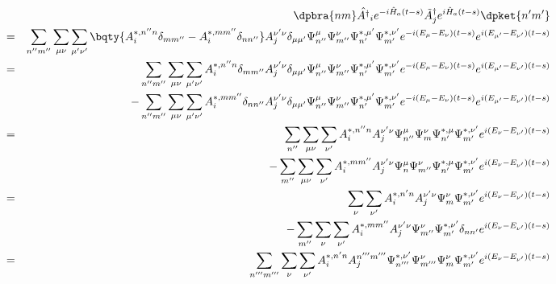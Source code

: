 \documentclass[10.5pt,a4paper]{jreport}
\begin{document}
\begin{eqnarray}
  \nonumber &&\dpbra{nm}\hat{A^\dagger}_ie^{-i\hat{H}_a(t-s)}\tilde{A}_j^\dagger e^{i\hat{H}_a(t-s)}\dpket{n'm'}\\
  \nonumber &=& \sum_{n''m''}\sum_{\mu\nu}\sum_{\mu'\nu'}\bqty{A_i^{*,  {n''n}}\delta_{mm''} - A_i^{*,  {mm''}}\delta_{nn''}}A_j^{ {\nu'\nu}}\delta_{ {\mu\mu'}}\Psi_{n''}^{\mu}\Psi_{m''}^{\nu}\Psi_{n'}^{*, \mu'}\Psi_{m'}^{*, \nu'}e^{-i(E_\mu - E_\nu)(t-s)}e^{i(E_{\mu'} - E_{\nu'})(t-s)}\\
  \nonumber &=&\sum_{n''m''}\sum_{\mu\nu}\sum_{\mu'\nu'}A_i^{*,  {n''n}}\delta_{mm''}A_j^{ {\nu'\nu}}\delta_{ {\mu\mu'}}\Psi_{n''}^{\mu}\Psi_{m''}^{\nu}\Psi_{n'}^{*, \mu'}\Psi_{m'}^{*, \nu'}e^{-i(E_\mu - E_\nu)(t-s)}e^{i(E_{\mu'} - E_{\nu'})(t-s)}\\
  &&- \sum_{n''m''}\sum_{\mu\nu}\sum_{\mu'\nu'}A_i^{*,  {mm''}}\delta_{nn''}A_j^{ {\nu'\nu}}\delta_{ {\mu\mu'}}\Psi_{n''}^{\mu}\Psi_{m''}^{\nu}\Psi_{n'}^{*, \mu'}\Psi_{m'}^{*, \nu'}e^{-i(E_\mu - E_\nu)(t-s)}e^{i(E_{\mu'} - E_{\nu'})(t-s)}\\
  \nonumber &=&\sum_{n''}\sum_{\mu\nu}\sum_{ {\nu'}}A_i^{*,  {n''n}}A_j^{ {\nu'\nu}}\Psi_{n''}^{\mu}\Psi_{m}^{\nu}\Psi_{n'}^{*, \mu}\Psi_{m'}^{*, \nu'}e^{ {i(E_\nu- E_{\nu'})(t-s)}}\\
  &&- \sum_{m''}\sum_{\mu\nu}\sum_{ {\nu'}}A_i^{*,  {mm''}}A_j^{ {\nu'\nu}}\Psi_{n}^{\mu}\Psi_{m''}^{\nu}\Psi_{n'}^{*, \mu}\Psi_{m'}^{*, \nu'}e^{ {i(E_\nu- E_{\nu'})(t-s)}}\\
  \nonumber &=&\sum_{ {\nu}}\sum_{ {\nu'}}A_i^{*,  {n'n}}A_j^{ {\nu'\nu}}\Psi_{m}^{\nu}\Psi_{m'}^{*, \nu'}e^{ {i(E_\nu- E_{\nu'})(t-s)}}\\
  &&- \sum_{ {m''}}\sum_{ {\nu}}\sum_{ {\nu'}}A_i^{*,  {mm''}}A_j^{ {\nu'\nu}}\Psi_{m''}^{\nu}\Psi_{m'}^{*, \nu'}\delta_{ {nn'}}e^{ {i(E_\nu- E_{\nu'})(t-s)}}\\
  \nonumber &=&\sum_{n'''m'''}\sum_{ {\nu}}\sum_{ {\nu'}}A_i^{*, {n'n}}A_j^{{n'''m'''}}\Psi_{n'''}^{ {*, \nu'}}\Psi_{m'''}^{ {\nu}}\Psi_{m}^{ {\nu}}\Psi_{m'}^{*, \nu'}e^{ {i(E_\nu- E_{\nu'})(t-s)}}\\

\end{eqnarray}
\end{document}

